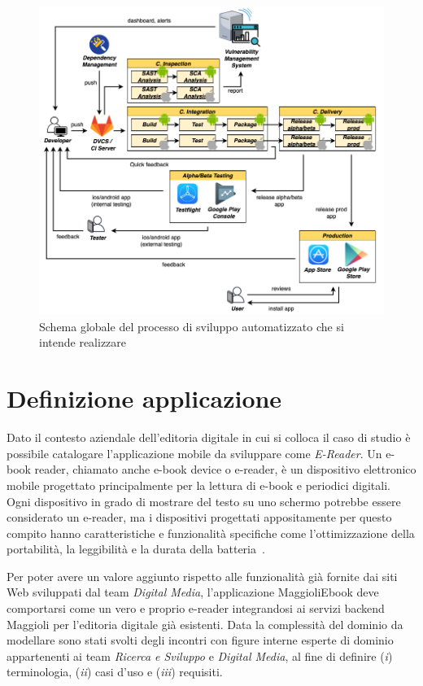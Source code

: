 \begin{figure}[H]
    \includegraphics[width=1\textwidth]{img/full-cicd.png}
    \caption{Schema globale del processo di sviluppo automatizzato che si intende realizzare}
    \label{full-cicd}
\end{figure}

\section{Definizione applicazione}
Dato il contesto aziendale dell'editoria digitale in cui si colloca il caso di studio è possibile catalogare l'applicazione mobile da sviluppare come \textit{E-Reader}. Un e-book reader, chiamato anche e-book device o e-reader, è un dispositivo elettronico mobile progettato principalmente per la lettura di e-book e periodici digitali. Ogni dispositivo in grado di mostrare del testo su uno schermo potrebbe essere considerato un e-reader, ma i dispositivi progettati appositamente per questo compito hanno caratteristiche e funzionalità specifiche come l'ottimizzazione della portabilità, la leggibilità e la durata della batteria~\cite{shoba2014vocabulary}.

Per poter avere un valore aggiunto rispetto alle funzionalità già fornite dai siti Web sviluppati dal team \textit{Digital Media}, l'applicazione MaggioliEbook deve comportarsi come un vero e proprio e-reader integrandosi ai servizi backend Maggioli per l'editoria digitale già esistenti. Data la complessità del dominio da modellare sono stati svolti degli incontri con figure interne esperte di dominio appartenenti ai team \textit{Ricerca e Sviluppo} e \textit{Digital Media}, al fine di definire (\textit{i}) terminologia, (\textit{ii}) casi d'uso e (\textit{iii}) requisiti.

